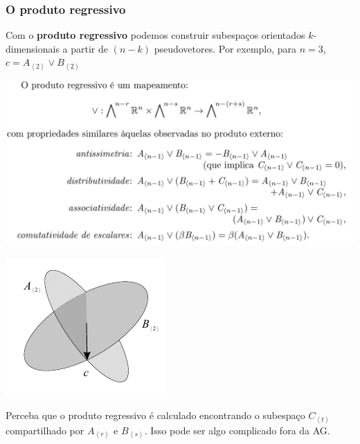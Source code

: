 \documentclass[10pt]{beamer}
\theoremstyle{plain}
\theoremstyle{definition}
\begin{document}
	\begin{frame}
		\frametitle{O produto regressivo}
		Com o \textbf{produto regressivo} podemos construir subespaços orientados $k$-dimensionais a partir de $(n-k)$ pseudovetores. Por exemplo, para $n=3$, $c = A_{\left <2\right >} \vee B_{\left <2\right >}$
		
		\vspace{0.5cm}
		\begin{minipage}{0.8\linewidth}
			\includegraphics[width=1\linewidth]{figures/produtoRegressivoDef.png}
		\end{minipage}
		\begin{minipage}{0.18\linewidth}
			\vspace{-3cm}
			\hspace{-1cm}
			\includegraphics[width=1.2\linewidth]{figures/produtoRegressivo.png}
		\end{minipage}
	
		\vspace{0.3cm}
		Perceba que o produto regressivo é calculado encontrando o subespaço $C_{\left <t\right >}$ compartilhado por $A_{\left <r\right >}$ e $B_{\left <s\right >}$. Isso pode ser algo complicado fora da AG.
	\end{frame}
	
\end{document}
